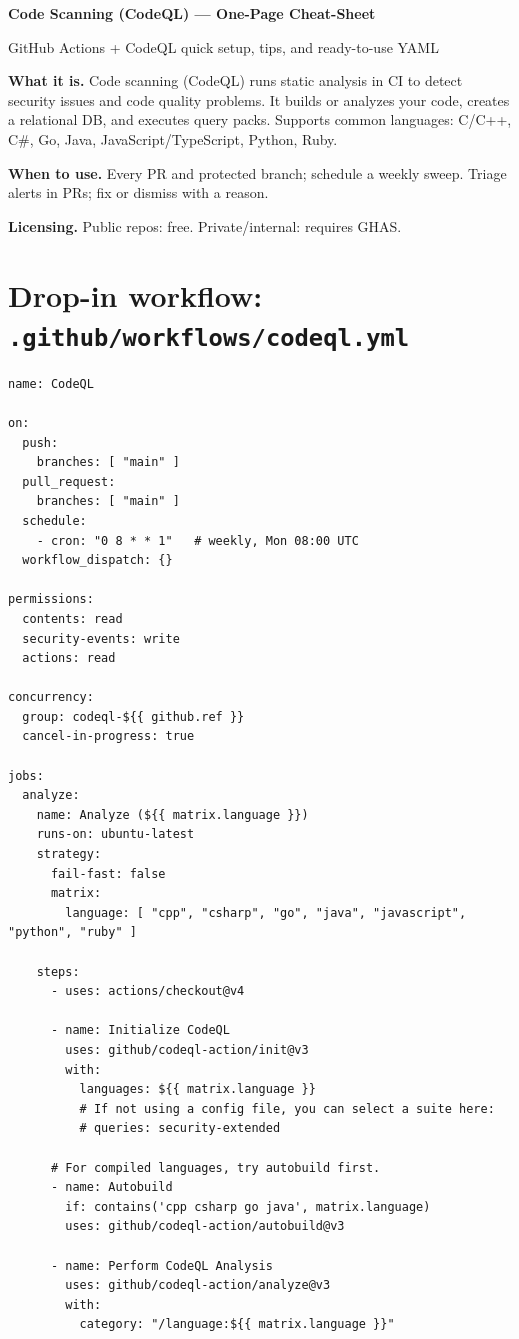 \documentclass[11pt]{article}
\def\maketitle{
  \begin{center}
    {\LARGE \bfseries Code Scanning (CodeQL) — One-Page Cheat-Sheet\par}
    \vspace{2pt}
    {\small GitHub Actions + CodeQL quick setup, tips, and ready-to-use YAML\par}
  \end{center}\vspace{6pt}
}
\begin{document}
\maketitle

\begin{tcolorbox}
\textbf{What it is.} Code scanning (CodeQL) runs static analysis in CI to detect security issues and code quality problems. It builds or analyzes your code, creates a relational DB, and executes query packs. Supports common languages: C/C++, C\#, Go, Java, JavaScript/TypeScript, Python, Ruby.

\smallskip
\textbf{When to use.} Every PR and protected branch; schedule a weekly sweep. Triage alerts in PRs; fix or dismiss with a reason.

\smallskip
\textbf{Licensing.} Public repos: free. Private/internal: requires GHAS.
\end{tcolorbox}

\section*{Drop-in workflow: \texttt{.github/workflows/codeql.yml}}
\begin{verbatim}
name: CodeQL

on:
  push:
    branches: [ "main" ]
  pull_request:
    branches: [ "main" ]
  schedule:
    - cron: "0 8 * * 1"   # weekly, Mon 08:00 UTC
  workflow_dispatch: {}

permissions:
  contents: read
  security-events: write
  actions: read

concurrency:
  group: codeql-${{ github.ref }}
  cancel-in-progress: true

jobs:
  analyze:
    name: Analyze (${{ matrix.language }})
    runs-on: ubuntu-latest
    strategy:
      fail-fast: false
      matrix:
        language: [ "cpp", "csharp", "go", "java", "javascript", "python", "ruby" ]

    steps:
      - uses: actions/checkout@v4

      - name: Initialize CodeQL
        uses: github/codeql-action/init@v3
        with:
          languages: ${{ matrix.language }}
          # If not using a config file, you can select a suite here:
          # queries: security-extended

      # For compiled languages, try autobuild first.
      - name: Autobuild
        if: contains('cpp csharp go java', matrix.language)
        uses: github/codeql-action/autobuild@v3

      - name: Perform CodeQL Analysis
        uses: github/codeql-action/analyze@v3
        with:
          category: "/language:${{ matrix.language }}"
\end{verbatim}
\end{document}
